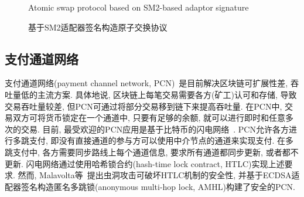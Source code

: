 \documentclass[review]{jcr}
\begin{document}
\begin{figure*}[!h]
\begin{center}
\caption{基于SM2适配器签名构造原子交换协议}{Atomic swap protocol based on SM2-based adaptor signature}
\label{Atomic swap protocol based on SM2-based adaptor signature}
\end{center}
\end{figure*}

\subsection{支付通道网络}
支付通道网络(payment channel network, PCN)~\cite{DeckerW15,PD2016,PC2018,MalavoltaMSKM19,AumayrEEFHMMR20}是目前解决区块链可扩展性差, 吞吐量低的主流方案. 具体地说, 区块链上每笔交易需要各方(矿工)认可和存储, 导致交易吞吐量较差, 但PCN可通过将部分交易移到链下来提高吞吐量. 在PCN中, 交易双方可将货币锁定在一个通道中, 只要有足够的余额, 就可以进行即时和任意多次的交易. 目前, 最受欢迎的PCN应用是基于比特币的闪电网络~\cite{PD2016}. PCN允许各方进行多跳支付, 即没有直接通道的参与方可以使用中介节点的通道来实现支付. 在多跳支付中, 各方需要同步路线上每个通道信息, 要求所有通道都同步更新, 或者都不更新. 闪电网络通过使用哈希锁合约(hash-time lock contract, HTLC)实现上述要求. 然而, Malavolta等~\cite{MalavoltaMSKM19}提出虫洞攻击可破坏HTLC机制的安全性, 并基于ECDSA适配器签名构造匿名多跳锁(anonymous multi-hop lock, AMHL)构建了安全的PCN.
\end{document}
